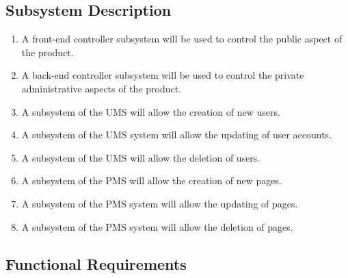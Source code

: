 \documentclass[11pt]{article}
\begin{document}
\subsection{Subsystem Description}

\begin{enumerate}
  \item A front-end controller subsystem will be used to control the public aspect of the product.
  \item A back-end controller subsystem will be used to control the private administrative aspects of the product.
  \item A subsystem of the UMS will allow the creation of new users.
  \item A subsystem of the UMS system will allow the updating of user accounts.
  \item A subsystem of the UMS will allow the deletion of users.
  \item A subsystem of the PMS will allow the creation of new pages.
  \item A subsystem of the PMS system will allow the updating of pages.
  \item A subsystem of the PMS system will allow the deletion of pages.
  


\end{enumerate}

\pagebreak

\subsection{Functional Requirements}
\end{document}
